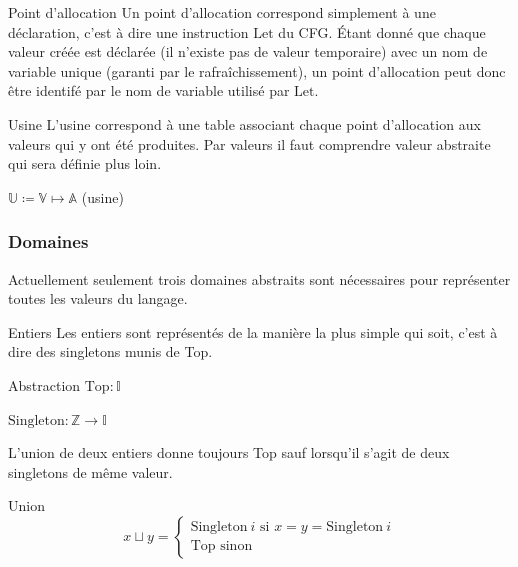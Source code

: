 \documentclass{beamer}
\begin{document}
\begin{frame}{Point d'allocation}
    Un point d'allocation correspond simplement à une déclaration, c'est à dire une instruction $\text{Let}$ du CFG. Étant donné que chaque valeur créée est déclarée (il n'existe pas de valeur temporaire) avec un nom de variable unique (garanti par le rafraîchissement), un point d'allocation peut donc être identifé par le nom de variable utilisé par $\text{Let}$. 
\end{frame}

\begin{frame}{Usine}
    L'usine correspond à une table associant chaque point d'allocation aux valeurs qui y ont été produites. Par valeurs il faut comprendre valeur abstraite qui sera définie plus loin.

    $\mathbb{U} \coloneqq \mathbb{V} \mapsto \mathbb{A}$ (usine)
\end{frame}

\subsubsection{Domaines}

Actuellement seulement trois domaines abstraits sont nécessaires pour représenter toutes les valeurs du langage.

\begin{frame}{Entiers}
    Les entiers sont représentés de la manière la plus simple qui soit, c'est à dire des singletons munis de Top.
    
    \begin{block}{Abstraction}
        $\text{Top} : \mathbb{I}$

        $\text{Singleton} : \mathbb{Z} \rightarrow \mathbb{I}$
    \end{block}

    L'union de deux entiers donne toujours Top sauf lorsqu'il s'agit de deux singletons de même valeur.

    \begin{block}{Union}
        $$
        x \sqcup y =
        \begin{cases}
            \text{Singleton} ~ i \text{ si } x = y = \text{Singleton} ~ i  \\
            \text{Top} \text{ sinon}
        \end{cases}
        $$
    \end{block}
\end{frame}
\end{document}
